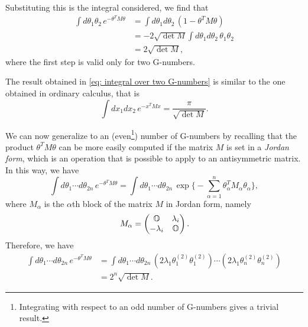 Substituting this is the integral considered, we find that 
\begin{equation}
\label{eq: integral over two G-numbers}
    \begin{split}
        \int d\theta_1\theta_2\,e^{-\theta^TM\theta} &= \int d\theta_1 d\theta_2\,(1 - \theta^TM\theta) \\
        &= -2\sqrt{\det{M}}\int d\theta_1 d\theta_2\,\theta_1\theta_2 \\
        &= 2\sqrt{\det{M}},
    \end{split}
\end{equation}
where the first step is valid only for two G-numbers.
\begin{obs}
    The result obtained in \eqref{eq: integral over two G-numbers} is similar to the one obtained in ordinary calculus, that is 
    \begin{equation}
        \int dx_1 dx_2\,e^{-x^TMx} = \frac{\pi}{\sqrt{\det{M}}}.
    \end{equation}
\end{obs}
We can now generalize to an (even\footnote{Integrating with respect to an odd number of G-numbers gives a trivial result.}) number of G-numbers by recalling that the product $\theta^TM\theta$ can be more easily computed if the matrix $M$ is set in a \emph{Jordan form}, which is an operation that is possible to apply to an antisymmetric matrix. In this way, we have 
\begin{equation}
    \int d\theta_1\cdots d\theta_{2n}\,e^{-\theta^TM\theta} = \int d\theta_1\cdots d\theta_{2n}\,\exp{\bigg\{-\sum_{\alpha=1}^n\theta_\alpha^TM_\alpha\theta_\alpha\bigg\}},
\end{equation}
where $M_\alpha$ is the $\alpha$th block of the matrix $M$ in Jordan form, namely 
\begin{equation}
    M_\alpha = 
    \begin{pmatrix}
        \mathbb{O} & \lambda_i \\
        -\lambda_i & \mathbb{O}
    \end{pmatrix}.
\end{equation}
Therefore, we have 
\begin{equation}
    \begin{split}
    \int d\theta_1\cdots d\theta_{2n}\,e^{-\theta^TM\theta} &= \int d\theta_1\cdots d\theta_{2n}\,(2\lambda_1\theta_1^{(2)}\theta_1^{(2)})\cdots(2\lambda_1\theta_n^{(2)}\theta_n^{(2)}) \\ 
    &= 2^n\sqrt{\det{M}}.
    \end{split}
\end{equation}
